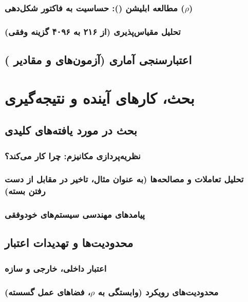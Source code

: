 \documentclass[12pt,a4paper]{report} %
\begin{document}
\subsection{مطالعه ابلیشن (): حساسیت به فاکتور شکل‌دهی (\texorpdfstring{$\rho$}{ρ})}
\subsection{تحلیل مقیاس‌پذیری (از ۲۱۶ به ۴۰۹۶ گزینه وفقی)}

\section{اعتبارسنجی آماری (آزمون‌های  و مقادیر )}

\newpage

\chapter{بحث، کارهای آینده و نتیجه‌گیری}

\section{بحث در مورد یافته‌های کلیدی}
\subsection{نظریه‌پردازی مکانیزم: چرا  کار می‌کند؟}
\subsection{تحلیل تعاملات و مصالحه‌ها (به عنوان مثال، تاخیر در مقابل از دست رفتن بسته)}
\subsection{پیامدهای مهندسی سیستم‌های خودوفقی}

\section{محدودیت‌ها و تهدیدات اعتبار}
\subsection{اعتبار داخلی، خارجی و سازه}
\subsection{محدودیت‌های رویکرد  (وابستگی به \texorpdfstring{$\rho$}{ρ}، فضاهای عمل گسسته)}
\end{document}
